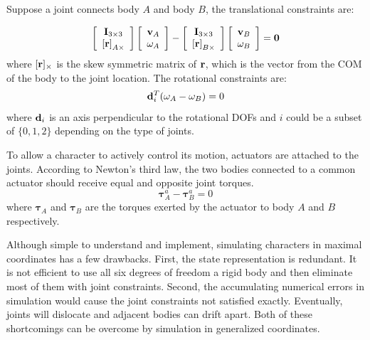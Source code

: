 Suppose a joint connects body $A$ and body $B$, the translational constraints are:

\begin{displaymath}
\left[\begin{array}{c}
\mathbf{I}_{3\times 3}\\
\mathbf{[r]}_{A\times}
\end{array}\right]
\left[\begin{array}{c}
\mathbf{v}_A \\
\mathbf{\omega}_A
\end{array}\right]-
\left[\begin{array}{c}
\mathbf{I}_{3\times 3}\\
\mathbf{[r]}_{B\times}
\end{array}\right]
\left[\begin{array}{c}
\mathbf{v}_B \\
\mathbf{\omega}_B
\end{array}\right]
=\mathbf{0}
\end{displaymath}
where $[\mathbf{r}]_\times$ is the skew symmetric matrix of $\mathbf{r}$, which is the vector from the COM of the body to the joint location. The rotational constraints are:
\begin{displaymath}
\mathbf{d}_i^T(\mathbf{\omega}_A-\mathbf{\omega}_B)=0
  \end{displaymath}
where $\mathbf{d}_i$ is an axis perpendicular to the rotational DOFs and $i$ could be a subset of $\{0,1,2\}$ depending on the type of joints. 

To allow a character to actively control its motion, actuators are attached to the joints. According to Newton's third law, the two bodies connected to a common actuator should receive equal and opposite joint torques.
\begin{equation}
\boldsymbol{\tau}^a_A-\boldsymbol{\tau}^a_B=0
\label{eq:actuatorConstraint}
\end{equation}
where $\boldsymbol{\tau}_A$ and $\boldsymbol{\tau}_B$ are the torques exerted by the actuator to body $A$ and $B$ respectively.

Although simple to understand and implement, simulating characters in maximal coordinates has a few drawbacks. First, the state representation is redundant. It is not efficient to use all six degrees of freedom a rigid body and then eliminate most of them with joint constraints. Second, the accumulating numerical errors in simulation would cause the joint constraints not satisfied exactly. Eventually, joints will dislocate and adjacent bodies can drift apart. Both of these shortcomings can be overcome by simulation in generalized coordinates.

